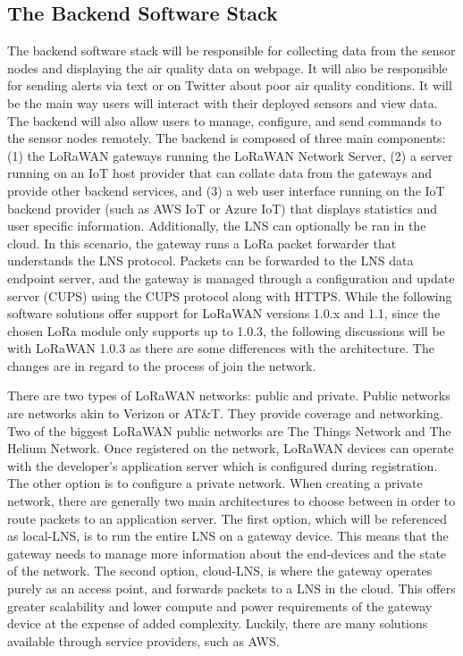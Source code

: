 \subsection{The Backend Software Stack}
The backend software stack will be responsible for collecting data from the sensor nodes and
displaying the air quality data on webpage. It will also be responsible for sending alerts via text
or on Twitter about poor air quality conditions. It will be the main way users will interact with
their deployed sensors and view data. The backend will also allow users to manage, configure, and
send commands to the sensor nodes remotely. The backend is composed of three main components: (1)
the LoRaWAN gateways running the LoRaWAN Network Server, (2) a server running on an IoT host
provider that can collate data from the gateways and provide other backend services, and (3) a web
user interface running on the IoT backend provider (such as AWS IoT or Azure IoT) that displays
statistics and user specific information. Additionally, the LNS can optionally be ran in the cloud.
In this scenario, the gateway runs a LoRa packet forwarder that understands the LNS protocol.
Packets can be forwarded to the LNS data endpoint server, and the gateway is managed through
a configuration and update server (CUPS) using the CUPS protocol along with HTTPS. While the
following software solutions offer support for LoRaWAN versions 1.0.x and 1.1, since the chosen LoRa
module only supports up to 1.0.3, the following discussions will be with LoRaWAN 1.0.3 as there are
some differences with the architecture. The changes are in regard to the process of join the
network. 

There are two types of LoRaWAN networks: public and private. Public networks are networks akin to
Verizon or AT\&T. They provide coverage and networking. Two of the biggest LoRaWAN public networks
are The Things Network and The Helium Network. Once registered on the network, LoRaWAN devices can
operate with the developer's application server which is configured during registration. The other
option is to configure a private network. When creating a private network, there are generally two
main architectures to choose between in order to route packets to an application server. The first
option, which will be referenced as local-LNS, is to run the entire LNS on a gateway device. This
means that the gateway needs to manage more information about the end-devices and the state of the
network. The second option, cloud-LNS, is where the gateway operates purely as an access point, and
forwards packets to a LNS in the cloud.  This offers greater scalability and lower compute and power
requirements of the gateway device at the expense of added complexity. Luckily, there are many
solutions available through service providers, such as AWS.

